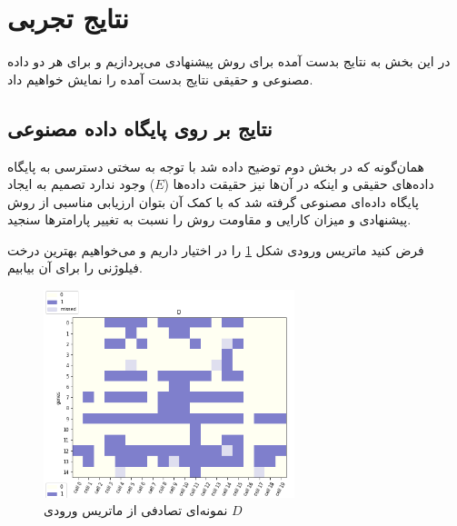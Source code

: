 %
\newpage
\section{نتایج تجربی}
در این بخش به نتایج بدست آمده برای روش پیشنهادی می‌پردازیم و برای هر دو داده مصنوعی و حقیقی نتایج بدست آمده را نمایش خواهیم داد.
\subsection{نتایج بر روی پایگاه داده مصنوعی}
همان‌گونه که در بخش دوم توضیح داده شد با توجه به سختی دسترسی به پایگاه داده‌های حقیقی و اینکه در آن‌ها نیز حقیقت داده‌ها ($E$) وجود ندارد تصمیم به ایجاد پایگاه داده‌ای مصنوعی گرفته شد که با کمک آن بتوان ارزیابی مناسبی از روش پیشنهادی و میزان کارایی و مقاومت روش را نسبت به تغییر پارامترها سنجید.

فرض کنید ماتریس ورودی شکل \ref{fig:sy_D1} را در اختیار داریم و می‌خواهیم بهترین درخت فیلوژنی را برای آن بیابیم.
\begin{figure}[!ht]
	\centering
	\includegraphics[width=0.65\textwidth]{img/chaps/er/s_input_D}
	\caption{نمونه‌ای تصادفی از ماتریس ورودی $D$}
	\label{fig:sy_D1}
\end{figure}

